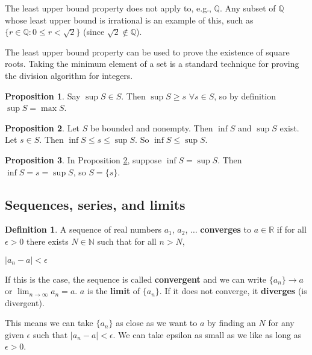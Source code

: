 \documentclass{article}
\theoremstyle{definition}
\newtheorem{definition}{Definition}[section]
\newtheorem{proposition}{Proposition}[section]
\begin{document}
The least upper bound property does not apply to, e.g., $\mathbb{Q}$. Any subset of $\mathbb{Q}$ whose least upper bound is irrational is an example of this, such as $\{r \in \mathbb{Q} : 0 \leq r < \sqrt{2}\}$ (since $\sqrt{2} \notin \mathbb{Q}$).

The least upper bound property can be used to prove the existence of square roots. Taking the minimum element of a set is a standard technique for proving the division algorithm for integers. 

\begin{proposition}
Say $\sup S \in S$. Then $\sup S \ge s$ $\forall s \in S$, so by definition $\sup S = \max S$.
\end{proposition}

\begin{proposition} \label{bound-comparison}
Let $S$ be bounded and nonempty. Then $\inf S$ and $\sup S$ exist. Let $s \in S$. Then $\inf S \le s \le \sup S$.
So $\inf S \le \sup S$.
\end{proposition}

\begin{proposition}
In Proposition \ref{bound-comparison}, suppose $\inf S = \sup S$. Then $\inf S = s = \sup S$, so $S = \{s\}$.
\end{proposition}

\subsection{Sequences, series, and limits}

\begin{definition} 
A sequence of real numbers $a_1$, $a_2$, $\ldots$ \textbf{converges} to $a \in \mathbb{R}$ if for all $\epsilon > 0$ there exists $N \in \mathbb{N}$ such that for all $n > N$,

\begin{center}
$|a_n - a| < \epsilon$
\end{center}

If this is the case, the sequence is called \textbf{convergent} and we can write $\{a_n\} \to a$ or $\lim_{n \to \infty} a_n = a$. $a$ is the \textbf{limit} of $\{a_n\}$. If it does not converge, it \textbf{diverges} (is divergent).
\end{definition}

This means we can take $\{a_n\}$ as close as we want to $a$ by finding an $N$ for any given $\epsilon$ such that $|a_n - a| < \epsilon$. We can take epsilon as small as we like as long as $\epsilon > 0$.
\end{document}
